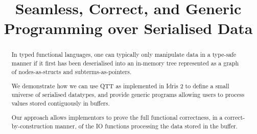 \documentclass[10pt]{article}
\title{Seamless, Correct, and Generic \\ Programming over Serialised Data}
\author{\iftoggle{BLIND}{ANONYMOUS}{Guillaume Allais}}
\newcommand{\idris}{Idris 2}
\begin{document}
\maketitle

\begin{abstract}
In typed functional languages, one can typically only manipulate data
in a type-safe manner if it first has been deserialised into an in-memory
tree represented as a graph of nodes-as-structs and subterms-as-pointers.

We demonstrate how we can use QTT as implemented in \idris{} to define
a small universe of serialised datatypes, and provide generic programs
allowing users to process values stored contiguously in buffers.

Our approach allows implementors to prove the full functional correctness,
in a correct-by-construction manner, of the IO functions processing the
data stored in the buffer.
\end{abstract}














\newpage

\end{document}

